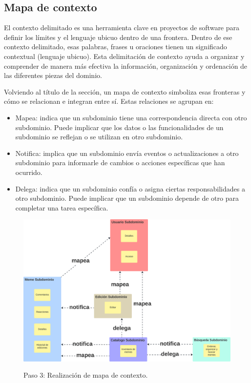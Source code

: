 \subsection{Mapa de contexto}

El contexto delimitado es una herramienta clave en proyectos de software para definir los límites y el lenguaje ubicuo dentro de una frontera. Dentro de ese contexto delimitado, esas palabras, frases u oraciones tienen un significado contextual (lenguaje ubicuo). Esta delimitación de contexto ayuda a organizar y comprender de manera más efectiva la información, organización y ordenación de las diferentes piezas del dominio.

Volviendo al título de la sección, un mapa de contexto simboliza esas fronteras y cómo se relacionan e integran entre sí. Estas relaciones se agrupan en:

\begin{itemize}
    \item Mapea: indica que un subdominio tiene una correspondencia directa con otro subdominio. Puede implicar que los datos o las funcionalidades de un subdominio se reflejan o se utilizan en otro subdominio.
    \item Notifica: implica que un subdominio envía eventos o actualizaciones a otro subdominio para informarle de cambios o acciones específicas que han ocurrido.
    \item Delega: indica que un subdominio confía o asigna ciertas responsabilidades a otro subdominio. Puede implicar que un subdominio depende de otro para completar una tarea específica.
\end{itemize}

\begin{figure}[H]
    \caption{Paso 3: Realización de mapa de contexto.}
    \centering
    \vspace*{0.5cm}
    \includegraphics[scale=0.1]{figuras/paso3.png}\label{fig:figuras/paso3.png}
\end{figure}
